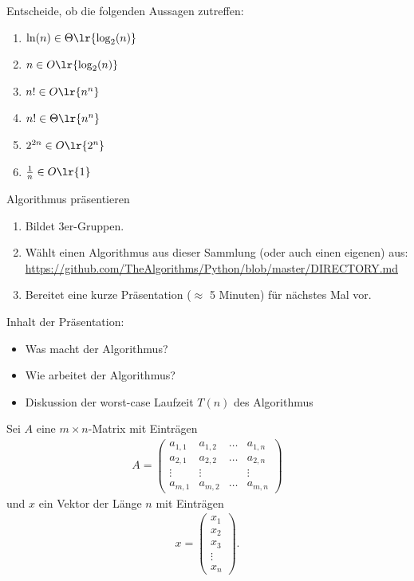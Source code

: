 \begin{frame}
	\begin{myexercise}\label{myexercise:complexity02}
		Entscheide, ob die folgenden Aussagen zutreffen:
		\begin{enumerate}
			\item $\ln(n) \in \Theta\lr{\log_2(n)}$
			\item $n \in O\lr{\log_2(n)}$
			\item $n! \in O\lr{n^n}$
			\item $n! \in \Theta\lr{n^n}$
			\item $2^{2n} \in O\lr{2^n}$
			\item $\frac{1}{n} \in O\lr{1}$
		\end{enumerate}
	\end{myexercise}
\end{frame}
\begin{frame}{Algorithmus präsentieren}
	\begin{enumerate}
		\item Bildet 3er-Gruppen.
		\item Wählt einen Algorithmus aus dieser Sammlung (oder auch einen eigenen) aus:\\
		\url{https://github.com/TheAlgorithms/Python/blob/master/DIRECTORY.md}
		\item Bereitet eine kurze Präsentation ($\approx$ 5 Minuten) für nächstes Mal vor.
	\end{enumerate}

	Inhalt der Präsentation:
	\begin{itemize}
		\item Was macht der Algorithmus?
		\item Wie arbeitet der Algorithmus?
		\item Diskussion der worst-case Laufzeit $T(n)$ des Algorithmus
	\end{itemize}
\end{frame}
\begin{frame}[fragile]
	Sei $A$ eine $m\times n$-Matrix mit Einträgen
	\begin{align*}
		A =
		\begin{pmatrix}
			a_{1,1} & a_{1,2} & \dots & a_{1,n} \\
			a_{2,1} & a_{2,2} & \dots & a_{2,n} \\
			\vdots  & \vdots  &       & \vdots  \\
			a_{m,1} & a_{m,2} & \dots & a_{m,n}
		\end{pmatrix}
	\end{align*}
	und $x$ ein Vektor der Länge $n$ mit Einträgen
	\begin{align*}
		x =
		\begin{pmatrix}
			x_1    \\
			x_2    \\
			x_3    \\
			\vdots \\
			x_n
		\end{pmatrix}.
	\end{align*}
\end{frame}

